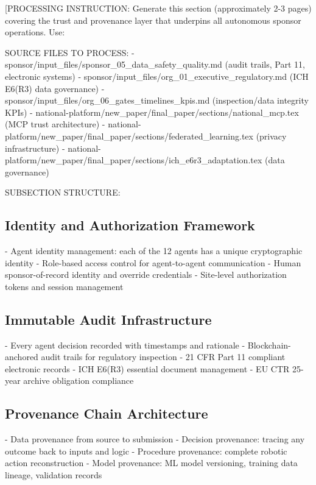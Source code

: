 
[PROCESSING INSTRUCTION: Generate this section (approximately 2-3 pages) covering the
trust and provenance layer that underpins all autonomous sponsor operations. Use:

SOURCE FILES TO PROCESS:
- sponsor/input\_files/sponsor\_05\_data\_safety\_quality.md (audit trails, Part 11, electronic systems)
- sponsor/input\_files/org\_01\_executive\_regulatory.md (ICH E6(R3) data governance)
- sponsor/input\_files/org\_06\_gates\_timelines\_kpis.md (inspection/data integrity KPIs)
- national-platform/new\_paper/final\_paper/sections/national\_mcp.tex (MCP trust architecture)
- national-platform/new\_paper/final\_paper/sections/federated\_learning.tex (privacy infrastructure)
- national-platform/new\_paper/final\_paper/sections/ich\_e6r3\_adaptation.tex (data governance)

SUBSECTION STRUCTURE:

\subsection{Identity and Authorization Framework}
- Agent identity management: each of the 12 agents has a unique cryptographic identity
- Role-based access control for agent-to-agent communication
- Human sponsor-of-record identity and override credentials
- Site-level authorization tokens and session management

\subsection{Immutable Audit Infrastructure}
- Every agent decision recorded with timestamps and rationale
- Blockchain-anchored audit trails for regulatory inspection
- 21 CFR Part 11 compliant electronic records
- ICH E6(R3) essential document management
- EU CTR 25-year archive obligation compliance

\subsection{Provenance Chain Architecture}
- Data provenance from source to submission
- Decision provenance: tracing any outcome back to inputs and logic
- Procedure provenance: complete robotic action reconstruction
- Model provenance: ML model versioning, training data lineage, validation records

